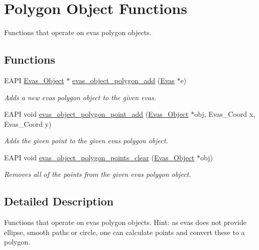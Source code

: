 \section{Polygon Object Functions}
\label{group__Evas__Object__Polygon}


Functions that operate on evas polygon objects.  


\subsection*{Functions}
\begin{DoxyCompactItemize}
\item 
EAPI \hyperlink{group__Evas__Object__Group_ga9e19e6dd1f517a0ba437c0114d3e7c97}{Evas\_\-Object} $\ast$ \hyperlink{group__Evas__Object__Polygon_gab6beb5b98de57a0f47707cac90f96bc9}{evas\_\-object\_\-polygon\_\-add} (\hyperlink{group__Evas__Canvas_ga5ff87cc4ce6bc43e3b640a6d37f73043}{Evas} $\ast$e)
\begin{DoxyCompactList}\small\item\em Adds a new evas polygon object to the given evas. \item\end{DoxyCompactList}\item 
EAPI void \hyperlink{group__Evas__Object__Polygon_ga92cb2d99c88404307e30eed74688da76}{evas\_\-object\_\-polygon\_\-point\_\-add} (\hyperlink{group__Evas__Object__Group_ga9e19e6dd1f517a0ba437c0114d3e7c97}{Evas\_\-Object} $\ast$obj, Evas\_\-Coord x, Evas\_\-Coord y)
\begin{DoxyCompactList}\small\item\em Adds the given point to the given evas polygon object. \item\end{DoxyCompactList}\item 
EAPI void \hyperlink{group__Evas__Object__Polygon_ga6d559daf3a5eea36a275aaf3c76c8be2}{evas\_\-object\_\-polygon\_\-points\_\-clear} (\hyperlink{group__Evas__Object__Group_ga9e19e6dd1f517a0ba437c0114d3e7c97}{Evas\_\-Object} $\ast$obj)
\begin{DoxyCompactList}\small\item\em Removes all of the points from the given evas polygon object. \item\end{DoxyCompactList}\end{DoxyCompactItemize}


\subsection{Detailed Description}
Functions that operate on evas polygon objects. Hint: as evas does not provide ellipse, smooth paths or circle, one can calculate points and convert these to a polygon. 

